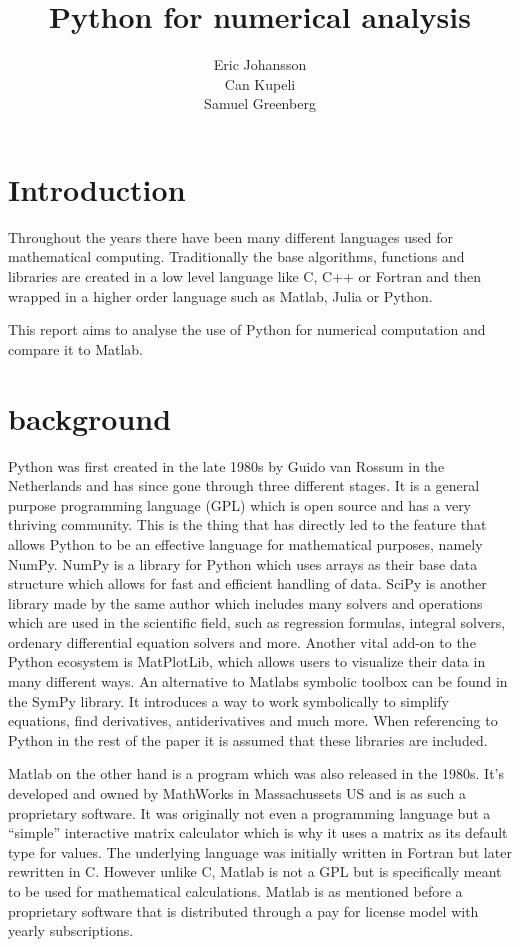 \documentclass{article}
\title{Python for numerical analysis}
\author{Eric Johansson\\Can Kupeli\\Samuel Greenberg}
\begin{document}
\maketitle
\newpage



\section{Introduction}%
\label{sec:introduction}
Throughout the years there have been many different languages used for mathematical computing.
Traditionally the base algorithms, functions and libraries are created in a low level language like C, C++ or Fortran and then wrapped
in a higher order language such as Matlab, Julia or Python.

This report aims to analyse the use of Python for numerical computation and compare it to Matlab.

\section{background}%
\label{sec:background}

Python was first created in the late 1980s by Guido van Rossum in the Netherlands and has since gone through three different stages.
It is a general purpose programming language (GPL) which is open source and has a very thriving community. This is the thing that has
directly led to the feature that allows Python to be an effective language for mathematical purposes, namely NumPy.
NumPy is a library for Python which uses arrays as their base data structure which allows for fast and efficient handling of data.
SciPy is another library made by the same author which includes many solvers and operations which are used in the scientific field, such
as regression formulas, integral solvers, ordenary differential equation solvers and more.
Another vital add-on to the Python ecosystem is MatPlotLib, which allows users to visualize their data in many different ways.
An alternative to Matlabs symbolic toolbox can be found in the SymPy library. It introduces a way to work symbolically to simplify
equations, find derivatives, antiderivatives and much more. When referencing to Python in the rest of the paper it is assumed that these
libraries are included.

Matlab on the other hand is a program which was also released in the 1980s. It's developed and owned by MathWorks in Massachussets US and
is as such a proprietary software. It was originally not even a programming language but a ``simple'' interactive matrix calculator which
is why it uses a matrix as its default type for values. The underlying language was initially written in Fortran but later rewritten
in C. However unlike C, Matlab is not a GPL but is specifically meant to be used for mathematical calculations. Matlab is as mentioned before a proprietary software that is distributed through a pay for license model with yearly subscriptions.
\end{document}
